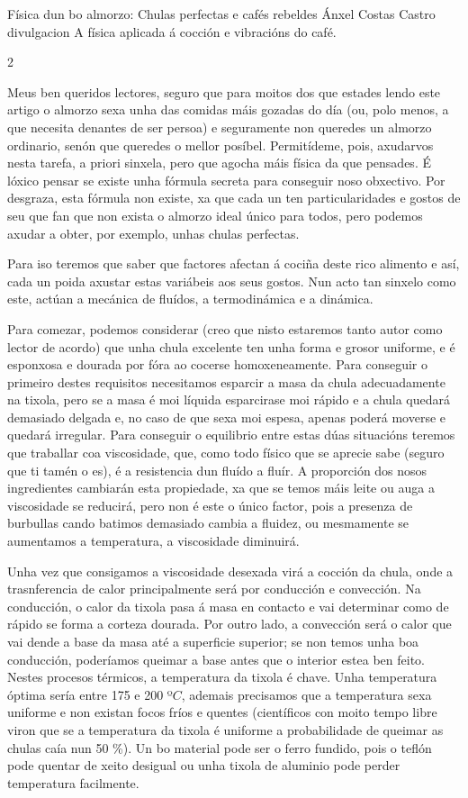 \Titular%
{Física dun bo almorzo: Chulas perfectas e cafés rebeldes}
{Ánxel Costas Castro}
{divulgacion}
{A física aplicada á cocción e vibracións do café.}


\begin{multicols}{2}

Meus ben queridos lectores, seguro que para moitos dos que estades lendo este
artigo o almorzo sexa unha das comidas máis gozadas do día (ou, polo menos, a
que necesita denantes de ser persoa) e seguramente non queredes un almorzo
ordinario, senón que queredes o mellor posíbel. Permitídeme, pois, axudarvos
nesta tarefa, a priori sinxela, pero que agocha máis física da que pensades. É
lóxico pensar se existe unha fórmula secreta para conseguir noso obxectivo. Por
desgraza, esta fórmula non existe, xa que cada un ten particularidades e gostos
de seu que fan que non exista o almorzo ideal único para todos, pero podemos
axudar a obter, por exemplo, unhas chulas perfectas.

Para iso teremos que saber que factores afectan á cociña deste rico alimento e
así, cada un poida axustar estas variábeis aos seus gostos. Nun acto tan
sinxelo como este, actúan a mecánica de fluídos, a termodinámica e a dinámica.

Para comezar, podemos considerar (creo que nisto estaremos tanto autor como
lector de acordo) que unha chula excelente ten unha forma e grosor uniforme, e
é esponxosa e dourada por fóra ao cocerse homoxeneamente. Para conseguir o
primeiro destes requisitos necesitamos esparcir a masa da chula adecuadamente
na tixola, pero se a masa é moi líquida esparcirase moi rápido e a chula
quedará demasiado delgada e, no caso de que sexa moi espesa, apenas poderá
moverse e quedará irregular. Para conseguir o equilibrio entre estas dúas
situacións teremos que traballar coa viscosidade, que, como todo físico que se
aprecie sabe (seguro que ti tamén o es), é a resistencia dun fluído a fluír. A
proporción dos nosos ingredientes cambiarán esta propiedade, xa que se temos
máis leite ou auga a viscosidade se reducirá, pero non é este o único factor,
pois a presenza de burbullas cando batimos demasiado cambia a fluidez, ou
mesmamente se aumentamos a temperatura, a viscosidade diminuirá. 

Unha vez que consigamos a viscosidade desexada virá a cocción da chula, onde a trasnferencia
de calor principalmente será por conducción e convección. Na conducción, o
calor da tixola pasa á masa en contacto e vai determinar como de rápido se
forma a corteza dourada. Por outro lado, a convección será o calor que vai
dende a base da masa até a superficie superior; se non temos unha boa
conducción, poderíamos queimar a base antes que o interior estea ben feito.
Nestes procesos térmicos, a temperatura da tixola é chave. Unha temperatura
óptima sería entre 175 e 200 º$C$, ademais precisamos que a temperatura sexa
uniforme e non existan focos fríos e quentes (científicos con moito tempo libre
viron que se a temperatura da tixola é uniforme a probabilidade de queimar as
chulas caía nun 50 \%). Un bo material pode ser o ferro fundido, pois o teflón pode
quentar de xeito desigual ou unha tixola de aluminio pode perder temperatura
facilmente.


\end{multicols}
